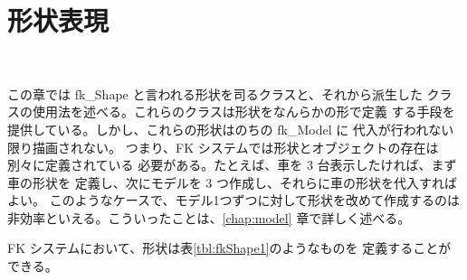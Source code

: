 \chapter{形状表現} \label{chap:shape} ~

この章では fk\_Shape と言われる形状を司るクラスと、それから派生した
クラスの使用法を述べる。これらのクラスは形状をなんらかの形で定義
する手段を提供している。しかし、これらの形状はのちの fk\_Model に
代入が行われない限り描画されない。
つまり、FK システムでは形状とオブジェクトの存在は別々に定義されている
必要がある。たとえば、車を 3 台表示したければ、まず車の形状を
定義し、次にモデルを 3 つ作成し、それらに車の形状を代入すればよい。
このようなケースで、モデル1つずつに対して形状を改めて作成するのは
非効率といえる。こういったことは、\ref{chap:model} 章で詳しく述べる。

FK システムにおいて、形状は表\ref{tbl:fkShape1}のようなものを
定義することができる。

